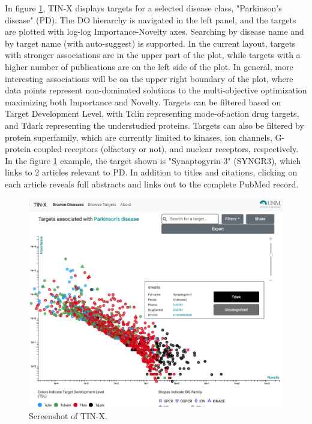 In figure \ref{fig:tinx_01}, TIN-X displays targets for a selected disease class, "Parkinson's disease" (PD).  The DO hierarchy is navigated in the left panel, and the targets are plotted with log-log Importance-Novelty axes. Searching by disease name and by target name (with auto-suggest) is supported. In the current layout, targets with stronger associations are in the upper part of the plot, while targets with a higher number of publications are on the left side of the plot. In general, more interesting associations will be on the upper right boundary of the plot, where data points represent non-dominated solutions to the multi-objective optimization maximizing both Importance and Novelty.  Targets can be filtered based on Target Development Level, with Tclin representing mode-of-action drug targets\cite{Santos2017-sd}, and Tdark representing the understudied proteins\cite{Nguyen2017-lo}. Targets can also be filtered by protein superfamily, which are currently limited to kinases, ion channels, G-protein coupled receptors (olfactory or not), and nuclear receptors, respectively. In the figure \ref{fig:tinx_01} example, the target shown is "Synaptogyrin-3" (SYNGR3), which links to 2 articles relevant to PD.  In addition to titles and citations, clicking on each article reveals full abstracts and links out to the complete PubMed record. 

\begin{figure}
    \centering
    \includegraphics[width=\linewidth]{figures/tinx/TINX_SYNRG3_rev3.png}
    \caption{Screenshot of TIN-X.}
    \label{fig:tinx_01}
\end{figure}


